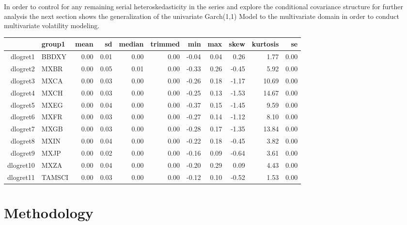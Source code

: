 \documentclass[11pt,preprint, authoryear]{elsarticle}
\let\origtable\table
\let\endorigtable\endtable
\renewenvironment{table}[1][2] {
    \expandafter\origtable\expandafter[H]
} {
    \endorigtable
}
\numberwithin{equation}{section}
\numberwithin{figure}{section}
\numberwithin{table}{section}
\begin{document}
In order to control for any remaining serial heteroskedasticity in the
series and explore the conditional covariance structure for further
analysis the next section shows the generalization of the univariate
Garch(1,1) Model to the multivariate domain in order to conduct
multivariate volatility modeling. \hfill

\begin{table}[H]
\centering
\begin{tabular}{rlrrrrrrrrr}
  \hline
 & group1 & mean & sd & median & trimmed & min & max & skew & kurtosis & se \\ 
  \hline
dlogret1 & BBDXY & 0.00 & 0.01 & 0.00 & 0.00 & -0.04 & 0.04 & 0.26 & 1.77 & 0.00 \\ 
  dlogret2 & MXBR & 0.00 & 0.05 & 0.01 & 0.00 & -0.33 & 0.26 & -0.45 & 5.92 & 0.00 \\ 
  dlogret3 & MXCA & 0.00 & 0.03 & 0.00 & 0.00 & -0.26 & 0.18 & -1.17 & 10.69 & 0.00 \\ 
  dlogret4 & MXCH & 0.00 & 0.03 & 0.00 & 0.00 & -0.25 & 0.13 & -1.53 & 14.67 & 0.00 \\ 
  dlogret5 & MXEG & 0.00 & 0.04 & 0.00 & 0.00 & -0.37 & 0.15 & -1.45 & 9.59 & 0.00 \\ 
  dlogret6 & MXFR & 0.00 & 0.03 & 0.00 & 0.00 & -0.27 & 0.14 & -1.12 & 8.10 & 0.00 \\ 
  dlogret7 & MXGB & 0.00 & 0.03 & 0.00 & 0.00 & -0.28 & 0.17 & -1.35 & 13.84 & 0.00 \\ 
  dlogret8 & MXIN & 0.00 & 0.04 & 0.00 & 0.00 & -0.22 & 0.18 & -0.45 & 3.82 & 0.00 \\ 
  dlogret9 & MXJP & 0.00 & 0.02 & 0.00 & 0.00 & -0.16 & 0.09 & -0.64 & 3.61 & 0.00 \\ 
  dlogret10 & MXZA & 0.00 & 0.04 & 0.00 & 0.00 & -0.20 & 0.29 & 0.09 & 4.43 & 0.00 \\ 
  dlogret11 & TAMSCI & 0.00 & 0.03 & 0.00 & 0.00 & -0.12 & 0.10 & -0.52 & 1.53 & 0.00 \\ 
   \hline
\end{tabular}
\caption{Descriptive Statistics Table \label{tab2}} 
\end{table}

\hypertarget{methodology}{%
\section{\texorpdfstring{Methodology
\label{Meth}}{Methodology }}\label{methodology}}
\end{document}
